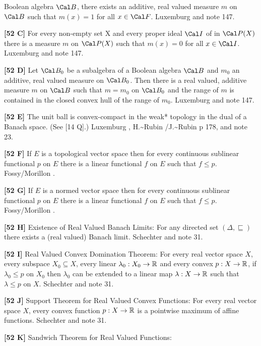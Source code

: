 Boolean algebra $\Cal B$, there exists an additive, real valued measure
$m$ on $\Cal B$ such that $m(x) = 1$ for all $x\in\Cal F$.
\ac{Luxemburg} \cite{1969} and note 147.
\smallskip
\item{}{\bf [52 C]} For every non-empty set X and every proper ideal
$\Cal I$ of in $\Cal P(X)$ there is a measure $m$ on $\Cal P(X)$ such
that $m(x) = 0$ for all $x\in\Cal I$.  \ac{Luxemburg} \cite{1969} and
note 147.
\smallskip
\item{}{\bf [52 D]} Let $\Cal B_0$ be a subalgebra of a Boolean algebra
$\Cal B$ and $m_0$ an additive, real valued measure on $\Cal B_0$.
Then there is a real valued, additive measure $m$ on $\Cal B$ such that
$m = m_0$ on $\Cal B_0$ and the range of $m$ is contained in the closed
convex hull of the range of $m_0$.  \ac{Luxemburg} \cite{1969} and note 147.
\smallskip
\item{}{\bf [52 E]}   The unit  ball  is  convex-compact in  the
weak* topology in the dual of a Banach space. (See [14 Q].)
\ac{Luxemburg} \cite{1969}, \ac{H.~Rubin /J.~Rubin} \cite{1985} p 178,
and note 23.
\smallskip
\item{}{\bf [52 F]} If $E$ is a topological vector space then for every
continuous sublinear functional $p$ on $E$ there is a linear
functional $f$ on $E$ such that $f\le p$. \ac{Fossy/Morillon} \cite{1998}.
\smallskip
\item{}{\bf [52 G]}  If $E$ is a normed vector space then for every
continuous sublinear functional $p$ on $E$ there is a linear
functional $f$ on $E$ such that $f\le p$. \ac{Fossy/Morillon} \cite{1998}.
\smallskip
\item{}{\bf [52 H]} Existence of Real Valued Banach Limits: For any directed
set $(\Delta,\sqsubseteq)$ there exists a (real valued) Banach limit.
\ac{Schechter} \cite{1996b} and note 31.
\smallskip
\item{}{\bf [52 I]} Real Valued Convex Domination Theorem: For every real
vector space $X$, every subspace $X_0\subseteq X$, every linear
$\lambda_0 :X_0\to {\Bbb R}$ and every convex $p: X\to {\Bbb R}$, if
$\lambda_0 \le p$ on $X_0$ then $\lambda_0$ can be extended to a linear
map $\lambda: X\to {\Bbb R} $ such that $\lambda \le p$ on $X$.
\ac{Schechter} \cite{1996b} and note 31.
\smallskip
\item{}{\bf [52 J]}  Support Theorem for Real Valued Convex Functions:
For every real vector space $X$,
every convex function $p: X\to {\Bbb R}$ is a pointwise maximum of
affine functions.  \ac{Schechter} \cite{1996b} and note 31.
\smallskip
\item{}{\bf [52 K]} Sandwich Theorem for Real Valued Functions:
